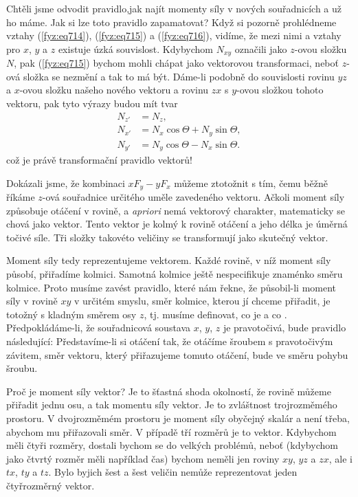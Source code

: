     Chtěli jsme odvodit pravidlo,jak najít momenty síly v nových souřadnicích a už ho máme. Jak si
    lze toto pravidlo zapamatovat? Když si pozorně prohlédneme vztahy (\ref{fyz:eq714}),
    (\ref{fyz:eq715}) a (\ref{fyz:eq716}), vidíme, že mezi nimi a vztahy pro \(x\), \(y\) a \(z\)
    existuje úzká souvislost. Kdybychom \(N_{xy}\) označili jako \(z\)-ovou složku \(N\), pak
    (\ref{fyz:eq715}) bychom mohli chápat jako vektorovou transformaci, neboť \(z\)-ová složka se
    nezmění a tak to má být. Dáme-li podobně do souvislosti rovinu \(yz\) a \(x\)-ovou složku našeho
    nového vektoru a rovinu \(zx\) s \(y\)-ovou složkou tohoto vektoru, pak tyto výrazy budou mít
    tvar
    \begin{subequations}\label{fyz:eq717}
      \begin{align}
        N_{z'} &=  N_z,                           \label{fyz:eq717a}  \\
        N_{x'} &=  N_x\cos\Theta + N_y\sin\Theta, \label{fyz:eq717b}  \\
        N_{y'} &=  N_y\cos\Theta - N_x\sin\Theta. \label{fyz:eq717c}        
      \end{align}
    \end{subequations} 
    což je právě transformační pravidlo vektorů!

    Dokázali jsme, že kombinaci \(xF_y - yF_x\) můžeme ztotožnit s tím, čemu běžně říkáme \(z\)-ová
    souřadnice určitého uměle zavedeného vektoru. Ačkoli moment síly způsobuje otáčení v rovině, a
    \emph{apriori} nemá vektorový charakter, matematicky se chová jako vektor. Tento vektor je kolmý
    k rovině otáčení a jeho délka je úměrná točivé síle. Tři složky takovéto veličiny se
    transformují jako skutečný vektor.

    Moment síly tedy reprezentujeme vektorem. Každé rovině, v níž moment síly působí, přiřadíme
    kolmici. Samotná kolmice ještě nespecifikuje znaménko směru kolmice. Proto musíme zavést
    pravidlo, které nám řekne, že působil-li moment síly v rovině \(xy\) v určitém smyslu, směr
    kolmice, kterou jí chceme přiřadit, je totožný s kladným směrem osy \(z\), tj. musíme definovat,
    co je  a co . Předpokládáme-li, že souřadnicová soustava \(x\), \(y\), \(z\)
    je pravotočivá, bude pravidlo následující: Představíme-li si otáčení tak, že otáčíme šroubem s
    pravotočivým závitem, směr vektoru, který přiřazujeme tomuto otáčení, bude ve směru pohybu
    šroubu.

    Proč je moment síly vektor? Je to šťastná shoda okolností, že rovině můžeme přiřadit jednu osu,
    a tak momentu síly vektor. Je to zvláštnost trojrozměmého prostoru. V dvojrozměmém prostoru je
    moment síly obyčejný skalár a není třeba, abychom mu přiřazovali směr. V případě tří rozměrů je
    to vektor. Kdybychom měli čtyři rozměry, dostali bychom se do velkých problémů, neboť (kdybychom
    jako čtvrtý rozměr měli například čas) bychom neměli jen roviny \(xy\), \(yz\) a \(zx\), ale i
    \(tx\), \(ty\) a \(tz\). Bylo byjich šest a šest veličin nemůže reprezentovat jeden čtyřrozměrný
    vektor.

